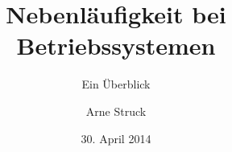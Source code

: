 \documentclass{beamer}
\title{Nebenläufigkeit bei Betriebssystemen}
\subtitle{Ein Überblick}
\author{Arne Struck}
\institute{Universität Hamburg}
\date{30. April 2014}
\begin{document}
\begin{frame}[plain]
	\maketitle
\end{frame}



\end{document}
